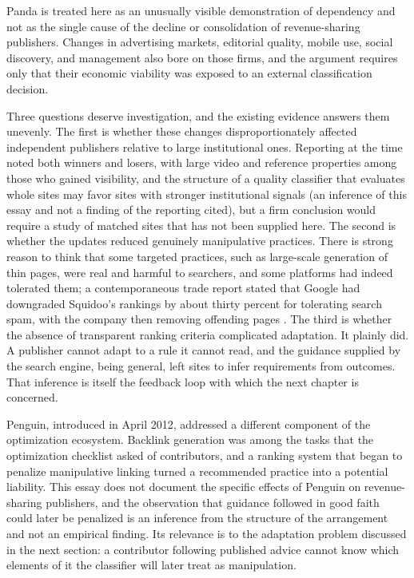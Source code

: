 \documentclass[11pt]{article}
\theoremstyle{remark}
\begin{document}
Panda is treated here as an unusually visible demonstration of dependency and not as the single cause of the decline or consolidation of revenue-sharing publishers. Changes in advertising markets, editorial quality, mobile use, social discovery, and management also bore on those firms, and the argument requires only that their economic viability was exposed to an external classification decision.

Three questions deserve investigation, and the existing evidence answers them unevenly. The first is whether these changes disproportionately affected independent publishers relative to large institutional ones. Reporting at the time noted both winners and losers, with large video and reference properties among those who gained visibility, and the structure of a quality classifier that evaluates whole sites may favor sites with stronger institutional signals (an inference of this essay and not a finding of the reporting cited), but a firm conclusion would require a study of matched sites that has not been supplied here. The second is whether the updates reduced genuinely manipulative practices. There is strong reason to think that some targeted practices, such as large-scale generation of thin pages, were real and harmful to searchers, and some platforms had indeed tolerated them; a contemporaneous trade report stated that Google had downgraded Squidoo's rankings by about thirty percent for tolerating search spam, with the company then removing offending pages \cite{clickz}. The third is whether the absence of transparent ranking criteria complicated adaptation. It plainly did. A publisher cannot adapt to a rule it cannot read, and the guidance supplied by the search engine, being general, left sites to infer requirements from outcomes. That inference is itself the feedback loop with which the next chapter is concerned.

Penguin, introduced in April 2012, addressed a different component of the optimization ecosystem. Backlink generation was among the tasks that the optimization checklist asked of contributors, and a ranking system that began to penalize manipulative linking turned a recommended practice into a potential liability. This essay does not document the specific effects of Penguin on revenue-sharing publishers, and the observation that guidance followed in good faith could later be penalized is an inference from the structure of the arrangement and not an empirical finding. Its relevance is to the adaptation problem discussed in the next section: a contributor following published advice cannot know which elements of it the classifier will later treat as manipulation.
\end{document}
